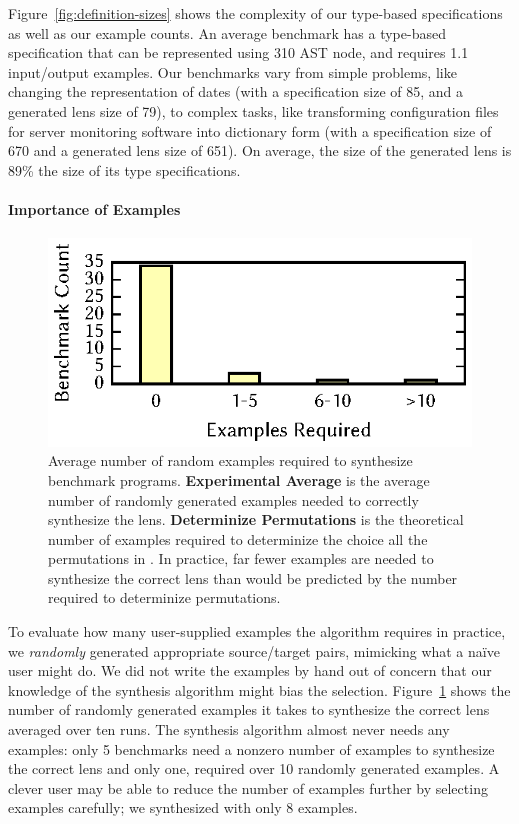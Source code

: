 \documentclass[12pt]{article}
\begin{document}
{Figure~\ref{fig:definition-sizes} shows the complexity of our type-based
specifications as well as our example counts.
An average benchmark has a type-based specification that can be represented using
310 AST node, and requires 1.1 input/output examples.
Our benchmarks vary from simple problems, like changing the
representation of dates
(with a specification size of 85, and a generated lens size of 79), to 
complex tasks, like transforming configuration files for server monitoring
software into dictionary form (with a specification size of 670 and
a generated lens size of 651).  On average, the size of the generated lens is
89\% the size of its type specifications.


\paragraph*{Importance of Examples}

\begin{figure}
  \centering
  \includegraphics{figs/examples.eps}
  \caption{Average number of random examples required to synthesize benchmark
    programs.  {\bf Experimental Average} is the average number of randomly
    generated examples needed to correctly synthesize the lens.  {\bf
      Determinize Permutations} is the theoretical number of examples required
    to determinize the choice all the permutations in \RigidSynth{}.
    In practice, far fewer examples are
    needed to synthesize the correct lens than would be predicted by the number
    required to determinize permutations.}
  \label{fig:exs-reqd}
\end{figure}

To evaluate how many user-supplied examples the algorithm requires in
practice, we \textit{randomly} generated appropriate source/target
pairs, mimicking what a na\"{i}ve user might do.  We did not write the
examples by hand out of concern that our knowledge of the synthesis
algorithm might bias the selection. Figure~\ref{fig:exs-reqd} shows
the number of randomly generated examples it takes to synthesize the
correct lens averaged over ten runs.  The synthesis algorithm almost never needs
any examples: only 5 benchmarks need a nonzero number of examples to
synthesize the correct lens and only one,  required over
10 randomly generated examples.
A clever user may be able to reduce the
number of examples further by selecting examples carefully; we
synthesized  with only 8 examples.

}
\end{document}
